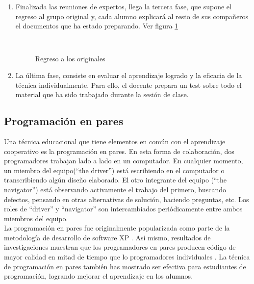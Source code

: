 \begin{enumerate}
    \item Finalizada las reuniones de expertos, llega la tercera fase, que supone el regreso al grupo original y, cada alumno explicará al resto de sus compañeros el documentos que ha estado preparando. Ver figura \ref{fig:jigsaw03}

\begin{figure}[h]
  \centering
  \\
  \caption{Regreso a los originales}\label{fig:jigsaw03}
\end{figure}

\item La última fase, consiste en evaluar el aprendizaje logrado y la eficacia de la técnica individualmente. Para ello, el docente prepara un test sobre todo el material que ha sido trabajado durante la sesión de clase.

\end{enumerate}

\subsection{Programación en pares}
Una técnica educacional que tiene elementos en común con el aprendizaje cooperativo es la programación en pares. En esta forma de colaboración, dos programadores trabajan lado a lado en un computador. En cualquier momento, un miembro del equipo(``the driver'') está escribiendo en el computador o transcribiendo algún diseño elaborado. El otro integrante del equipo (``the navigator'') está observando activamente el trabajo del primero, buscando defectos, pensando en otras alternativas de solución, haciendo preguntas, etc. Los roles de ``driver'' y ``navigator'' son intercambiados periódicamente entre ambos miembros del equipo.\\

La programación en pares fue originalmente popularizada como parte de la metodología de desarrollo de software XP \cite{beck_extreme_2000}. Así mismo, resultados de investigaciones muestran que los programadores en pares producen código de mayor calidad en mitad de tiempo que lo programadores individuales \cite{williams2000collaborative,williams_strengthening_2000}. La técnica de programación en pares también has mostrado ser efectiva para estudiantes de programación, logrando mejorar el aprendizaje en los alumnos\cite{mcdowell_effects_2002}.

